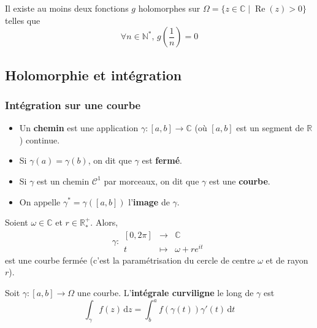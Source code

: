   \begin{cexample}
    Il existe au moins deux fonctions $g$ holomorphes sur $\Omega = \{ z \in \mathbb{C} \mid \operatorname{Re}(z) > 0 \}$ telles que
    \[ \forall n \in \mathbb{N}^*, \, g\left( \frac{1}{n} \right) = 0 \]
  \end{cexample}

  \subsection{Holomorphie et intégration}

  \subsubsection{Intégration sur une courbe}


  \begin{definition}
    \begin{itemize}
      \item Un \textbf{chemin} est une application $\gamma : [a,b] \rightarrow \mathbb{C}$ (où $[a,b]$ est un segment de $\mathbb{R}$) continue.
      \item Si $\gamma(a) = \gamma(b)$, on dit que $\gamma$ est \textbf{fermé}.
      \item Si $\gamma$ est un chemin $\mathcal{C}^1$ par morceaux, on dit que $\gamma$ est une \textbf{courbe}.
      \item On appelle $\gamma^* = \gamma([a,b])$ l'\textbf{image} de $\gamma$.
    \end{itemize}
  \end{definition}

  \begin{example}
    Soient $\omega \in \mathbb{C}$ et $r \in \mathbb{R}^+_*$. Alors,
    \[
      \gamma :
      \begin{array}{ccc}
        [0,2\pi] &\rightarrow& \mathbb{C} \\
        t &\mapsto& \omega + re^{it}
      \end{array}
    \]
    est une courbe fermée (c'est la paramétrisation du cercle de centre $\omega$ et de rayon $r$).
  \end{example}

  \begin{definition}
    Soit $\gamma : [a,b] \rightarrow \Omega$ une courbe. L'\textbf{intégrale curviligne} le long de $\gamma$ est
    \[ \int_\gamma f(z) \, \mathrm{d}z = \int_b^a f(\gamma(t)) \gamma'(t) \, \mathrm{d}t \]
  \end{definition}

